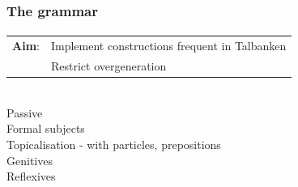 \documentclass[10pt]{beamer}
\renewcommand{\baselinestretch}{1.5}
\begin{document}
\begin{frame}
\frametitle{The grammar}
\framesubtitle{} 
\begin{tabular}{ll}
\textbf{Aim}: & Implement constructions frequent in Talbanken\\
&Restrict overgeneration\\
\end{tabular}\\
Passive\\
Formal subjects\\
Topicalisation - with particles, prepositions\\
Genitives \\
Reflexives
\end{frame}

\end{document}

